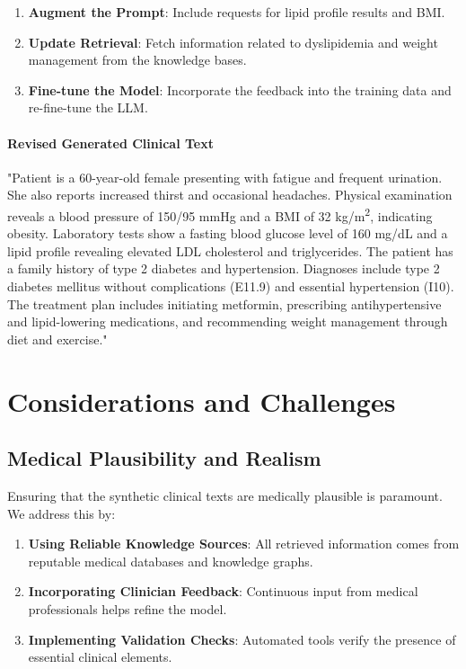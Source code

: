 \documentclass[12pt, a4paper]{article}
\begin{document}
\begin{enumerate}
    \item \textbf{Augment the Prompt}: Include requests for lipid profile results and BMI.
    \item \textbf{Update Retrieval}: Fetch information related to dyslipidemia and weight management from the knowledge bases.
    \item \textbf{Fine-tune the Model}: Incorporate the feedback into the training data and re-fine-tune the LLM.
\end{enumerate}

\paragraph{Revised Generated Clinical Text}

"Patient is a 60-year-old female presenting with fatigue and frequent urination. She also reports increased thirst and occasional headaches. Physical examination reveals a blood pressure of 150/95 mmHg and a BMI of 32 kg/m\textsuperscript{2}, indicating obesity. Laboratory tests show a fasting blood glucose level of 160 mg/dL and a lipid profile revealing elevated LDL cholesterol and triglycerides. The patient has a family history of type 2 diabetes and hypertension. Diagnoses include type 2 diabetes mellitus without complications (E11.9) and essential hypertension (I10). The treatment plan includes initiating metformin, prescribing antihypertensive and lipid-lowering medications, and recommending weight management through diet and exercise."

\section{Considerations and Challenges}

\subsection{Medical Plausibility and Realism}

Ensuring that the synthetic clinical texts are medically plausible is paramount. We address this by:

\begin{enumerate}
    \item \textbf{Using Reliable Knowledge Sources}: All retrieved information comes from reputable medical databases and knowledge graphs.
    \item \textbf{Incorporating Clinician Feedback}: Continuous input from medical professionals helps refine the model.
    \item \textbf{Implementing Validation Checks}: Automated tools verify the presence of essential clinical elements.
\end{enumerate}
\end{document}

